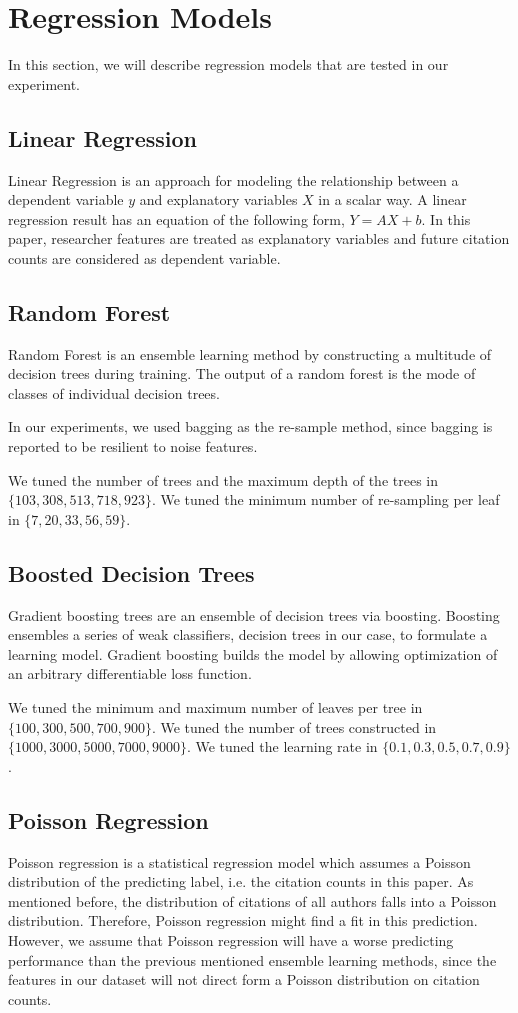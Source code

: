 \section{Regression Models}
In this section, we will describe regression models that are tested in our experiment.

\subsection{Linear Regression}
Linear Regression is an approach for modeling the relationship between a dependent variable $y$ and explanatory variables $X$ in a scalar way. A linear regression result has an equation of the following form, $Y = AX +b$. In this paper, researcher features are treated as explanatory variables and future citation counts are considered as dependent variable.
\subsection{Random Forest}
Random Forest is an ensemble learning method by constructing a multitude of decision trees during training. The output of a random forest is the mode of classes of individual decision trees.

In our experiments, we used bagging as the re-sample method, since bagging is reported to be resilient to noise features\cite{dietterich2000ensemble}.

We tuned the number of trees and the maximum depth of the trees in $\{103,308,513,718,923\}$.
We tuned the minimum number of re-sampling per leaf in $\{7,20,33,56,59\}$.

\subsection{Boosted Decision Trees}
Gradient boosting trees are an ensemble of decision trees via boosting. Boosting ensembles a series of weak classifiers, decision trees in our case, to formulate a learning model. Gradient boosting builds the model by allowing optimization of an arbitrary differentiable loss function\cite{friedman2002stochastic}.

We tuned the minimum and maximum number of leaves per tree in $\{100,300,500,700,900\}$.
We tuned the number of trees constructed in $\{1000,3000,5000,7000,9000\}$.
We tuned the learning rate in $\{0.1,0.3,0.5,0.7,0.9\}$.

\subsection{Poisson Regression}
Poisson regression is a statistical regression model which assumes a Poisson distribution of the predicting label, i.e. the citation counts in this paper. As mentioned before, the distribution of citations of all authors falls into a Poisson distribution. Therefore, Poisson regression might find a fit in this prediction. However, we assume that Poisson regression will have a worse predicting performance than the previous mentioned ensemble learning methods, since the features in our dataset will not direct form a Poisson distribution on citation counts.

